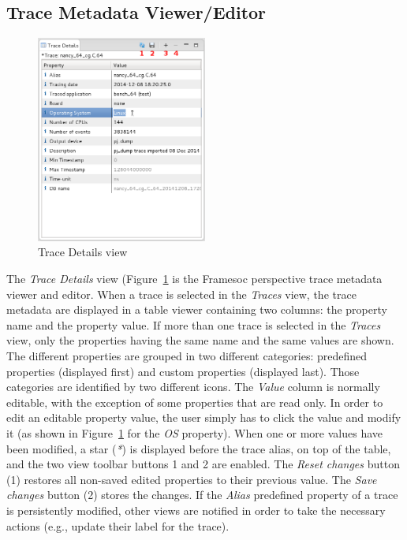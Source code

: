 \documentclass[twoside]{article}
\begin{document}
\begin{sloppypar}
\subsection{Trace Metadata Viewer/Editor}
\label{subsec:metadata}

\begin{figure}[h!]
  \centering
    \includegraphics[width=0.5\textwidth]{images/metadata_editing.png}
  \caption{Trace Details view}
  \label{fig:metadata_editing}
\end{figure}

The \emph{Trace Details} view (Figure~\ref{fig:metadata_editing} is the Framesoc perspective trace metadata viewer and editor.
When a trace is selected in the \emph{Traces} view, the trace metadata are displayed in a table viewer containing two columns: the property name and the property value.
If more than one trace is selected in the \emph{Traces} view, only the properties having the same name and the same values are shown.
The different properties are grouped in two different categories: predefined properties (displayed first) and custom properties (displayed last). 
Those categories are identified by two different icons.
The \emph{Value} column is normally editable, with the exception of some properties that are read only.
In order to edit an editable property value, the user simply has to click the value and modify it (as shown in Figure~\ref{fig:metadata_editing} for the \emph{OS} property).
When one or more values have been modified, a star (\emph{*}) is displayed before the trace alias, on top of the table, and the two view toolbar buttons \num{1} and \num{2} are enabled. 
The \emph{Reset changes} button (\num{1}) restores all non-saved edited properties to their previous value.
The \emph{Save changes} button (\num{2}) stores the changes.
If the \emph{Alias} predefined property of a trace is persistently modified, other views are notified in order to take the necessary actions (e.g., update their label for the trace).


\end{sloppypar}
\end{document}
